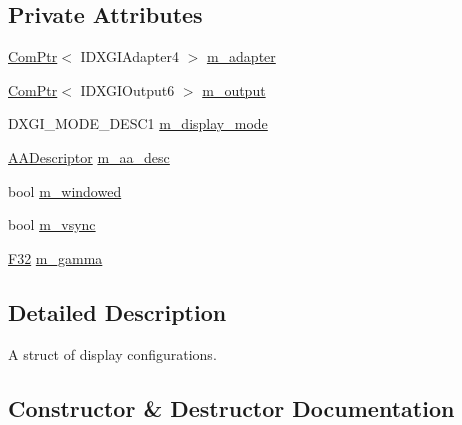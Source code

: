 \subsection*{Private Attributes}
\begin{DoxyCompactItemize}
\item 
\hyperlink{namespacemage_ae74f374780900893caa5555d1031fd79}{Com\+Ptr}$<$ I\+D\+X\+G\+I\+Adapter4 $>$ \hyperlink{structmage_1_1_display_configuration_a30ccc2ff8cb8e041e0afc6dabdb0d967}{m\+\_\+adapter}
\item 
\hyperlink{namespacemage_ae74f374780900893caa5555d1031fd79}{Com\+Ptr}$<$ I\+D\+X\+G\+I\+Output6 $>$ \hyperlink{structmage_1_1_display_configuration_a57cc88b552858c6a9ac74577140beb14}{m\+\_\+output}
\item 
D\+X\+G\+I\+\_\+\+M\+O\+D\+E\+\_\+\+D\+E\+S\+C1 \hyperlink{structmage_1_1_display_configuration_ac59d5e7c5553ef4842090bf1a83bd7ca}{m\+\_\+display\+\_\+mode}
\item 
\hyperlink{namespacemage_a86cd40b8f2f42ca4d616cc6ec665a7f2}{A\+A\+Descriptor} \hyperlink{structmage_1_1_display_configuration_a253dc142f092f327649aed3c8ca6c95f}{m\+\_\+aa\+\_\+desc}
\item 
bool \hyperlink{structmage_1_1_display_configuration_a0c447e4bd7ea72313315c657e9cd0d95}{m\+\_\+windowed}
\item 
bool \hyperlink{structmage_1_1_display_configuration_a22dd3b35e58260c9555a37aef0e85a4d}{m\+\_\+vsync}
\item 
\hyperlink{namespacemage_aa97e833b45f06d60a0a9c4fc22ae02c0}{F32} \hyperlink{structmage_1_1_display_configuration_a6056d18cba04331488bb27eb033c783e}{m\+\_\+gamma}
\end{DoxyCompactItemize}


\subsection{Detailed Description}
A struct of display configurations. 

\subsection{Constructor \& Destructor Documentation}
\hypertarget{structmage_1_1_display_configuration_a2ca58b8cc3b408c50fccb9cf94eb5dc6}{}\label{structmage_1_1_display_configuration_a2ca58b8cc3b408c50fccb9cf94eb5dc6} 
